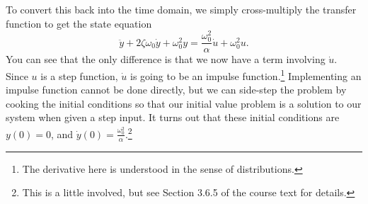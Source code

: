 To convert this back into the time domain, we simply cross-multiply the
transfer function to get the state equation
\begin{equation*}
    \ddot y +2\zeta\omega_{0}\dot y+\omega_{0}^{2}y =
    \frac{\omega_{0}^{2}}{\alpha}\dot u+\omega_{0}^{2}u.
\end{equation*}
You can see that the only difference is that we now have a term involving
\(\dot u \).  Since \(u \) is a step function, \(\dot{u} \) is going to be an impulse
function.\footnote{The derivative here is understood in the sense of
    distributions.}  Implementing an impulse function cannot be done directly,
but we can side-step the problem by cooking the initial conditions so that
our initial value problem is a solution to our system when given a step
input.  It turns out that these initial conditions are \(y(0)=0 \), and \(\dot{y}(0)=\frac{\omega_{0}^{2}}{\alpha}\).\footnote{This is a little involved,
    but see Section 3.6.5 of the course text for
    details.}
